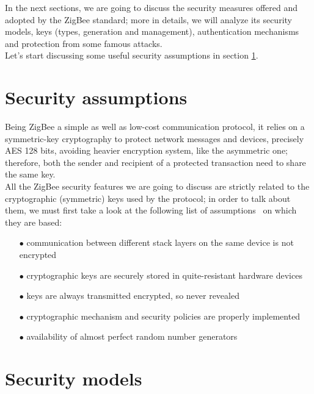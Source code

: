 \documentclass[12pt]{report}
\begin{document}
{{In the next sections, we are going to discuss the security measures offered and adopted by the ZigBee standard; more in details, we will analyze its security models, keys (types, generation and management), authentication mechanisms and protection from some famous attacks.\\

Let's start discussing some useful security assumptions in section \ref{sec:zigbeesecassumptions}.


\clearpage
\section{Security assumptions}
\label{sec:zigbeesecassumptions}
\bigskip
Being ZigBee a simple as well as low-cost communication protocol, it relies on a symmetric-key cryptography to protect network messages and devices, precisely AES 128 bits, avoiding heavier encryption system, like the asymmetric one; therefore, both the sender and recipient of a protected transaction need to share the same key.\\

All the ZigBee security features we are going to discuss are strictly related to the cryptographic (symmetric) keys used by the protocol; in order to talk about them, we must first take a look at the following list of assumptions~\cite{secanalysisofzigbee} on which they are based:

\begin{itemize}
\setlength{\itemindent}{+4mm}
\item[$\bullet$] communication between different stack layers on the same device is not encrypted
\item[$\bullet$] cryptographic keys are securely stored in quite-resistant hardware devices
\item[$\bullet$] keys are always transmitted encrypted, so never revealed
\item[$\bullet$] cryptographic mechanism and security policies are properly implemented
\item[$\bullet$] availability of almost perfect random number generators\\
\end{itemize}

\clearpage
\section{Security models}
\bigskip

}}
\end{document}
